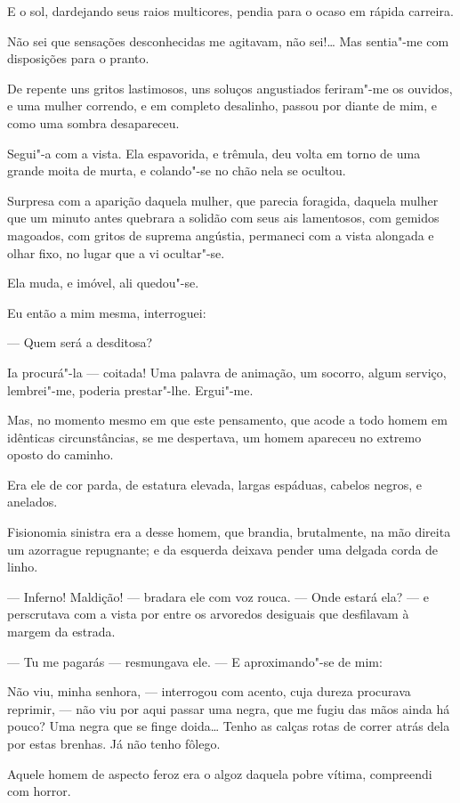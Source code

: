 E o sol, dardejando seus raios multicores, pendia para o ocaso em rápida
carreira.

Não sei que sensações desconhecidas me agitavam, não sei!\ldots{} Mas
sentia"-me com disposições para o pranto.

De repente uns gritos lastimosos, uns soluços angustiados feriram"-me os
ouvidos, e uma mulher correndo, e em completo desalinho, passou por
diante de mim, e como uma sombra desapareceu.

Segui"-a com a vista. Ela espavorida, e trêmula, deu volta em torno de
uma grande moita de murta, e colando"-se no chão nela se ocultou.

Surpresa com a aparição daquela mulher, que parecia foragida, daquela
mulher que um minuto antes quebrara a solidão com seus ais lamentosos,
com gemidos magoados, com gritos de suprema angústia, permaneci com a
vista alongada e olhar fixo, no lugar que a vi ocultar"-se.

Ela muda, e imóvel, ali quedou"-se.

Eu então a mim mesma, interroguei:

--- Quem será a desditosa?

Ia procurá"-la --- coitada! Uma palavra de animação, um socorro, algum
serviço, lembrei"-me, poderia prestar"-lhe. Ergui"-me.

Mas, no momento mesmo em que este pensamento, que acode a todo homem em
idênticas circunstâncias, se me despertava, um homem apareceu no extremo
oposto do caminho.

Era ele de cor parda, de estatura elevada, largas espáduas, cabelos
negros, e anelados.

Fisionomia sinistra era a desse homem, que brandia, brutalmente, na mão
direita um azorrague repugnante; e da esquerda deixava pender uma
delgada corda de linho.

--- Inferno! Maldição! --- bradara ele com voz rouca. --- Onde estará
ela? --- e perscrutava com a vista por entre os arvoredos desiguais que
desfilavam à margem da estrada.

--- Tu me pagarás --- resmungava ele. --- E aproximando"-se de mim:

Não viu, minha senhora, --- interrogou com acento, cuja dureza procurava
reprimir, --- não viu por aqui passar uma negra, que me fugiu das mãos
ainda há pouco? Uma negra que se finge doida\ldots{} Tenho as calças rotas de
correr atrás dela por estas brenhas. Já não tenho fôlego.

Aquele homem de aspecto feroz era o algoz daquela pobre vítima,
compreendi com horror.

